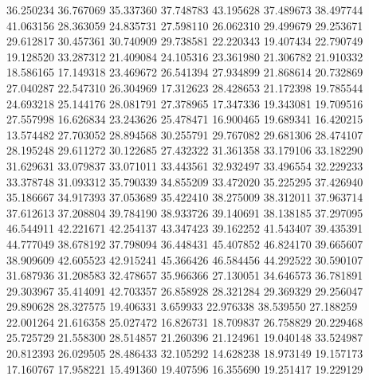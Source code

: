 36.250234
36.767069
35.337360
37.748783
43.195628
37.489673
38.497744
41.063156
28.363059
24.835731
27.598110
26.062310
29.499679
29.253671
29.612817
30.457361
30.740909
29.738581
22.220343
19.407434
22.790749
19.128520
33.287312
21.409084
24.105316
23.361980
21.306782
21.910332
18.586165
17.149318
23.469672
26.541394
27.934899
21.868614
20.732869
27.040287
22.547310
26.304969
17.312623
28.428653
21.172398
19.785544
24.693218
25.144176
28.081791
27.378965
17.347336
19.343081
19.709516
27.557998
16.626834
23.243626
25.478471
16.900465
19.689341
16.420215
13.574482
27.703052
28.894568
30.255791
29.767082
29.681306
28.474107
28.195248
29.611272
30.122685
27.432322
31.361358
33.179106
33.182290
31.629631
33.079837
33.071011
33.443561
32.932497
33.496554
32.229233
33.378748
31.093312
35.790339
34.855209
33.472020
35.225295
37.426940
35.186667
34.917393
37.053689
35.422410
38.275009
38.312011
37.963714
37.612613
37.208804
39.784190
38.933726
39.140691
38.138185
37.297095
46.544911
42.221671
42.254137
43.347423
39.162252
41.543407
39.435391
44.777049
38.678192
37.798094
36.448431
45.407852
46.824170
39.665607
38.909609
42.605523
42.915241
45.366426
46.584456
44.292522
30.590107
31.687936
31.208583
32.478657
35.966366
27.130051
34.646573
36.781891
29.303967
35.414091
42.703357
26.858928
28.321284
29.369329
29.256047
29.890628
28.327575
19.406331
3.659933
22.976338
38.539550
27.188259
22.001264
21.616358
25.027472
16.826731
18.709837
26.758829
20.229468
25.725729
21.558300
28.514857
21.260396
21.124961
19.040148
33.524987
20.812393
26.029505
28.486433
32.105292
14.628238
18.973149
19.157173
17.160767
17.958221
15.491360
19.407596
16.355690
19.251417
19.229129
